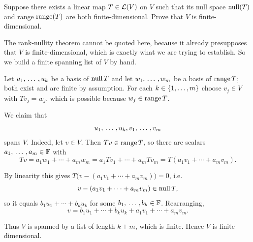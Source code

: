 \begin{xrcs}
  Suppose there exists a linear map $T \in \mathcal{L}(V)$ on $V$ such that its null space $\operatorname{null}(T)$ and range $\operatorname{range}(T)$ are both finite-dimensional. Prove that $V$ is finite-dimensional.

  \begin{xprf}
    The rank-nullity theorem cannot be quoted here, because it already presupposes that $V$ is finite-dimensional, which is exactly what we are trying to establish. So we build a finite spanning list of $V$ by hand.

    Let $u_1, {\, \ldots \,\,}, u_k$ be a basis of $\operatorname{null} T$ and let $w_1, {\, \ldots \,\,}, w_m$ be a basis of $\operatorname{range} T$; both exist and are finite by assumption. For each $k \in \{1, \dots, m \}$ choose $v_j \in V$ with $T v_j = w_j$, which is possible because $w_j \in \operatorname{range} T$.

    We claim that
    \begin{equation}
      u_1, {\, \ldots \,\,}, u_k, v_1, {\, \ldots \,\,}, v_m
    \end{equation}
    spans $V$. Indeed, let $v \in V$. Then $Tv \in \operatorname{range} T$, so there are scalars $a_1, {\, \ldots \,\,}, a_m \in \mathbb{F}$ with
    \begin{equation}
      Tv = a_1 w_1 + \cdots + a_m w_m = a_1 T v_1 + \cdots + a_m T v_m = T(a_1 v_1 + \cdots + a_m v_m).
    \end{equation}

    By linearity this gives $T\big(v - (a_1 v_1 + \cdots + a_m v_m)\big) = 0$, i.e.
    \begin{equation}
      v - (a_1 v_1 + \cdots + a_m v_m) \in \operatorname{null} T,
    \end{equation}
    so it equals $b_1 u_1 + \cdots + b_k u_k$ for some $b_1, {\, \ldots \,\,}, b_k \in \mathbb{F}$. Rearranging,
    \begin{equation}
      v = b_1 u_1 + \cdots + b_k u_k + a_1 v_1 + \cdots + a_m v_m.
    \end{equation}

    Thus $V$ is spanned by a list of length $k+m$, which is finite. Hence $V$ is finite-dimensional.
  \end{xprf}
\end{xrcs}

